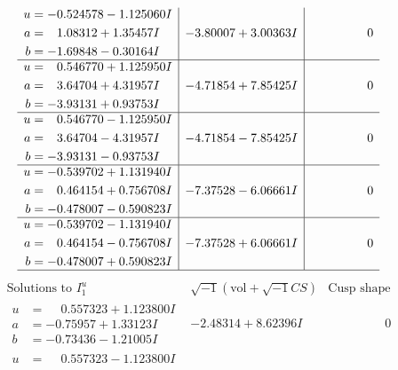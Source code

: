 \documentclass[1p]{elsarticle_modified}
\theoremstyle{definition}
\newcommand{\I}{\sqrt{-1}}
\begin{document}
$$\begin{array}{c|c|c}
\begin{aligned}
u &= -0.524578 - 1.125060 I \\
a &= \phantom{-}1.08312 + 1.35457 I \\
b &= -1.69848 - 0.30164 I\end{aligned}
 & -3.80007 + 3.00363 I & \phantom{-0.000000 } 0 \\ \hline\begin{aligned}
u &= \phantom{-}0.546770 + 1.125950 I \\
a &= \phantom{-}3.64704 + 4.31957 I \\
b &= -3.93131 + 0.93753 I\end{aligned}
 & -4.71854 + 7.85425 I & \phantom{-0.000000 } 0 \\ \hline\begin{aligned}
u &= \phantom{-}0.546770 - 1.125950 I \\
a &= \phantom{-}3.64704 - 4.31957 I \\
b &= -3.93131 - 0.93753 I\end{aligned}
 & -4.71854 - 7.85425 I & \phantom{-0.000000 } 0 \\ \hline\begin{aligned}
u &= -0.539702 + 1.131940 I \\
a &= \phantom{-}0.464154 + 0.756708 I \\
b &= -0.478007 - 0.590823 I\end{aligned}
 & -7.37528 - 6.06661 I & \phantom{-0.000000 } 0 \\ \hline\begin{aligned}
u &= -0.539702 - 1.131940 I \\
a &= \phantom{-}0.464154 - 0.756708 I \\
b &= -0.478007 + 0.590823 I\end{aligned}
 & -7.37528 + 6.06661 I & \phantom{-0.000000 } 0\\
 \hline 
 \end{array}$$\newpage$$\begin{array}{c|c|c}  
\text{Solutions to }I^u_{1}& \I (\text{vol} + \sqrt{-1}CS) & \text{Cusp shape}\\
 \hline 
\begin{aligned}
u &= \phantom{-}0.557323 + 1.123800 I \\
a &= -0.75957 + 1.33123 I \\
b &= -0.73436 - 1.21005 I\end{aligned}
 & -2.48314 + 8.62396 I & \phantom{-0.000000 } 0 \\ \hline\begin{aligned}
u &= \phantom{-}0.557323 - 1.123800 I \\

\end{aligned}
\end{array}$$
\end{document}
